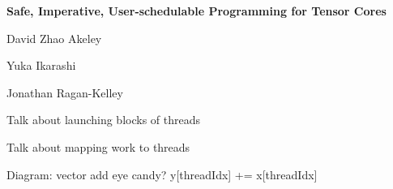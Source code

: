 
\textbf{\hfill \large Safe, Imperative, User-schedulable Programming for Tensor Cores}

{\LARGE

\vfill

David Zhao Akeley

Yuka Ikarashi

Jonathan Ragan-Kelley

\hfill {}}


\newpage
{}

{\LARGE

Talk about launching blocks of threads

Talk about mapping work to threads

Diagram: vector add eye candy? y[threadIdx] += x[threadIdx]

}

\newpage
{}

